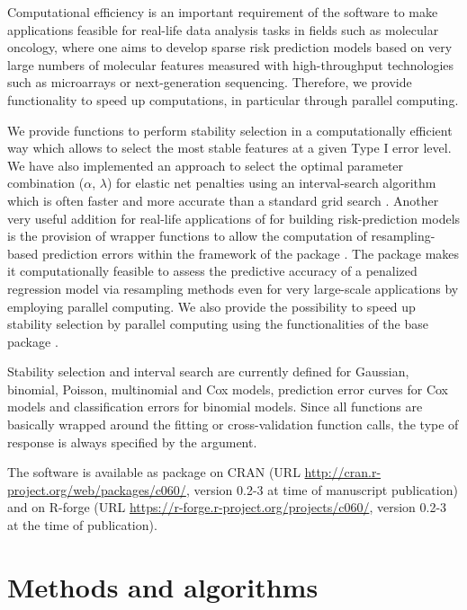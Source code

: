 \documentclass[]{jss}
\begin{document}
Computational efficiency is an important requirement of the software to make applications feasible for real-life data analysis tasks in fields such as molecular oncology, where one aims to develop sparse risk prediction models based on very large numbers of molecular features measured with high-throughput technologies such as microarrays or next-generation sequencing. Therefore, we provide functionality to speed up computations, in particular through parallel computing.

We provide  functions to perform stability selection \citep{MeinshausenBuehlmann2010} in a computationally efficient way which allows to select the most stable features at a given Type I error level. We have also implemented an approach to select the optimal parameter combination ($\alpha$, $\lambda$) for elastic net penalties using an interval-search algorithm \citep{froehlich2005} which is often faster and more accurate than a standard grid search \citep{Jones1998}. Another very useful addition for real-life applications of  for building risk-prediction models is the provision of wrapper functions to allow the computation of resampling-based prediction errors within the framework of the  package  \citep{Porz2009}. The  package makes it computationally feasible to assess the
predictive accuracy of a penalized regression model via resampling methods even for very large-scale applications by employing parallel computing. We also provide the possibility to speed up stability selection by parallel computing using the functionalities of the  base package  \citep{R11}.

Stability selection and interval search are currently defined for Gaussian, binomial, Poisson, multinomial and Cox models,  prediction error curves for Cox models and classification errors for
binomial models. Since all functions are basically wrapped around the  fitting or cross-validation function calls, the type of response is always specified by the  argument. 

The software is available as  package  on CRAN (URL \url{http://cran.r-project.org/web/packages/c060/}, version 0.2-3 at time of manuscript publication) and on R-forge (URL \url{https://r-forge.r-project.org/projects/c060/}, version 0.2-3 at the time of publication).

\section{Methods and algorithms}
\end{document}
